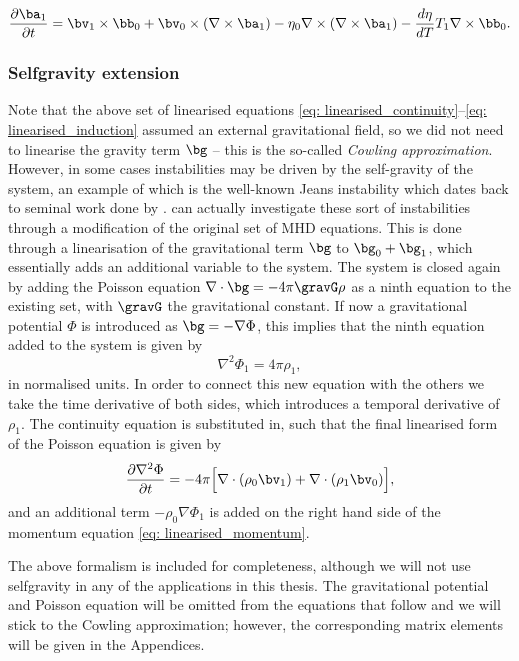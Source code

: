 {\begin{equation} \label{eq: linearised_induction}
  \frac{\partial \ba_1}{\partial t} =
    \bv_1 \times \bb_0
    + \bv_0 \times \left(\nabla \times \ba_1\right)
    - \eta_0 \nabla \times \left(\nabla \times \ba_1\right)
    - \frac{d\eta}{dT}T_1 \nabla \times \bb_0.
\end{equation}
}


\subsubsection{Selfgravity extension}
Note that the above set of linearised equations \eqref{eq: linearised_continuity}--\eqref{eq: linearised_induction} assumed an external gravitational field, so we did not need to linearise the gravity term $\bg$ -- this is the so-called \emph{Cowling approximation}. However, in some cases instabilities may be driven by the self-gravity of the system, an example of which is the well-known Jeans instability which dates back to seminal work done by \citet{book_jeans}. {\legolas} can actually investigate these sort of instabilities through a modification of the original set of MHD equations. This is done through a linearisation of the gravitational term $\bg$ to $\bg_0 + \bg_1$, which essentially adds an additional variable to the system. The system is closed again by adding the Poisson equation $\nabla \cdot \bg = -4\pi \gravG \rho$ as a ninth equation to the existing set, with $\gravG$ the gravitational constant. If now a gravitational potential $\Phi$ is introduced as $\bg = -\nabla \Phi$, this implies that the ninth equation added to the system is given by
\begin{equation}
  \nabla^2\Phi_1 = 4\pi\rho_1,
\end{equation}
in normalised units. In order to connect this new equation with the others we take the time derivative of both sides, which introduces a temporal derivative of $\rho_1$. The continuity equation is substituted in, such that the final linearised form of the Poisson equation is given by
\begin{equation}
  \frac{\partial \nabla^2 \Phi}{\partial t} =
    -4\pi \Bigl[\nabla \cdot \left(\rho_0 \bv_1\right) + \nabla \cdot \left(\rho_1 \bv_0\right)\Bigr],
\end{equation}
and an additional term $-\rho_0 \nabla \Phi_1$ is added on the right hand side of the momentum equation \eqref{eq: linearised_momentum}.

The above formalism is included for completeness, although we will not use selfgravity in any of the applications in this thesis. The gravitational potential and Poisson equation will be omitted from the equations that follow and we will stick to the Cowling approximation; however, the corresponding matrix elements will be given in the Appendices.

